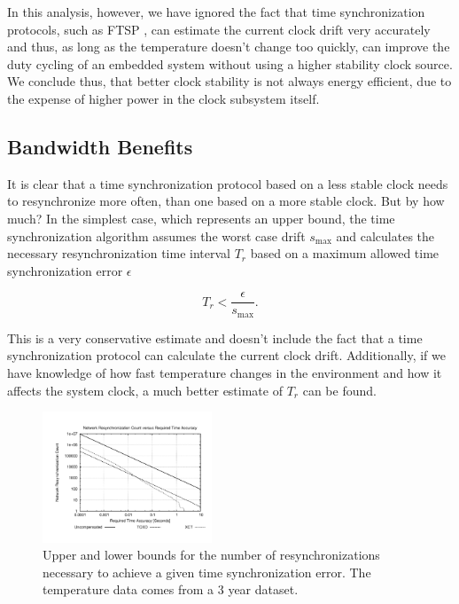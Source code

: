 In this analysis, however, we have ignored the fact that time synchronization
protocols, such as FTSP \cite{maroti2004ftsp}, can estimate the current clock
drift very accurately and thus, as long as the temperature doesn't change too
quickly, can improve the duty cycling of an embedded system without using a
higher stability clock source. We conclude thus, that better clock stability 
is not always energy efficient, due to the expense of higher power in the clock
subsystem itself.  

\subsection{Bandwidth Benefits}

It is clear that a time synchronization protocol based on a less
stable clock needs to resynchronize more often, than one based on
a more stable clock. But by how much? In the simplest case,
which represents an upper bound, the time synchronization algorithm assumes
the worst case drift $s_{\max}$ and calculates the necessary resynchronization
time interval $T_r$ based on a maximum allowed time synchronization error
$\epsilon$

\begin{equation}
    T_r < \frac{\epsilon}{s_{\max}}.
\end{equation}

This is a very conservative estimate and doesn't include the fact that a time
synchronization protocol can calculate the current clock drift. Additionally,
if we have knowledge of how fast temperature changes in the environment and
how it affects the system clock, a much better estimate of $T_r$ can be found. 

\begin{figure}
    \begin{center}
        \includegraphics[angle=-90,width=0.45\textwidth]{figures/mosscamresync}
        \caption{Upper and lower bounds for the number of resynchronizations
        necessary to achieve a given time synchronization error. The
        temperature data comes from a 3 year dataset.}
        \label{fig:resync}
    \end{center}
\end{figure}

